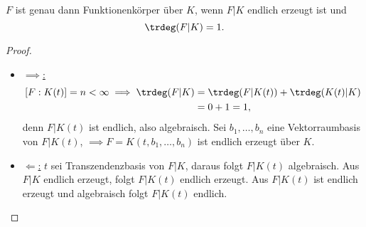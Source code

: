 \begin{satz}\label{satz:trdegFK}
    $F$ ist genau dann Funktionenkörper über $K$, wenn $F|K$ endlich erzeugt ist und 
    $$ \trdeg(F|K) = 1. $$
\end{satz}
\begin{proof}
    \begin{itemize}[label=]
        \item \underline{$\implies$:}
        \begin{align*}
            \left[F:K(t)\right] = n < \infty \implies \trdeg(F|K) & = \trdeg(F|K(t)) + \trdeg(K(t)|K)\\
            & = 0 + 1 = 1,
        \end{align*}
        denn $F|K(t)$ ist endlich, also algebraisch.
        Sei $b_1,\ldots,b_n$ eine Vektorraumbasis von $F|K(t)$, $\implies F=K(t, b_1,\ldots,b_n)$ ist endlich erzeugt über $K$. 
        \item \underline{$\Longleftarrow$:}
        $t$ sei Transzendenzbasis von $F|K$, daraus folgt $F|K(t)$ algebraisch.
        Aus $F|K$ endlich erzeugt, folgt $F|K(t)$ endlich erzeugt.
        Aus $F|K(t)$ ist endlich erzeugt und algebraisch folgt $F|K(t)$ endlich.
    \end{itemize}
\end{proof}

